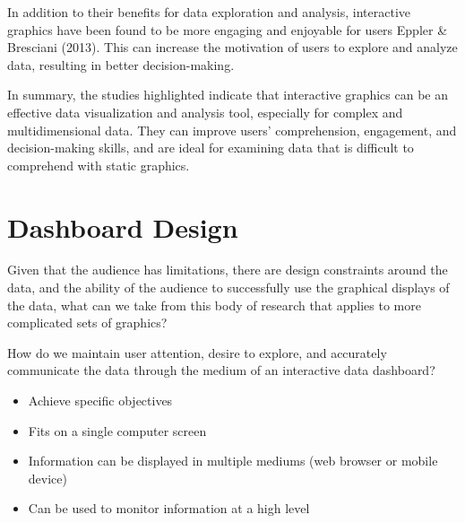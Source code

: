 \documentclass[print]{nuthesis}
\providecommand{\tightlist}{%
  \setlength{\itemsep}{0pt}\setlength{\parskip}{0pt}}
\begin{document}
In addition to their benefits for data exploration and analysis, interactive graphics have been found to be more engaging and enjoyable for users Eppler \& Bresciani (2013).
This can increase the motivation of users to explore and analyze data, resulting in better decision-making.

In summary, the studies highlighted indicate that interactive graphics can be an effective data visualization and analysis tool, especially for complex and multidimensional data.
They can improve users' comprehension, engagement, and decision-making skills, and are ideal for examining data that is difficult to comprehend with static graphics.

\hypertarget{dashboard-design}{%
\section{Dashboard Design}\label{dashboard-design}}

Given that the audience has limitations, there are design constraints around the data, and the ability of the audience to successfully use the graphical displays of the data, what can we take from this body of research that applies to more complicated sets of graphics?

How do we maintain user attention, desire to explore, and accurately communicate the data through the medium of an interactive data dashboard?


\begin{itemize}
\tightlist
\item
  Achieve specific objectives
\item
  Fits on a single computer screen
\item
  Information can be displayed in multiple mediums (web browser or mobile device)
\item
  Can be used to monitor information at a high level
\end{itemize}

\end{document}
